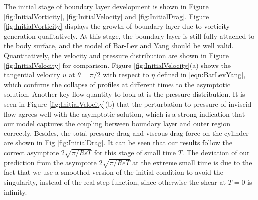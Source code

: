 The initial stage of boundary layer development is shown in Figure \ref{fig:InitialVorticity}, \ref{fig:InitialVelocity} and \ref{fig:InitialDrag}.
Figure \ref{fig:InitialVorticity} displays the growth of boundary layer due to vorticity generation qualitatively.
At this stage, the boundary layer is still fully attached to the body surface, and the model of Bar-Lev and Yang should be well valid.
Quantitatively, the velocity and pressure distribution are shown in Figure \ref{fig:InitialVelocity} for comparison.
Figure \ref{fig:InitialVelocity}(a) shows the tangential velocity $u$ at $\theta = \pi/2$ with respect to $\eta$ defined in \ref{eqn:BarLevYang}, which confirms the collapse of profiles at different times to the asymptotic solution.
Another key flow quantity to look at is the pressure distribution.
It is seen in Figure \ref{fig:InitialVelocity}(b) that the perturbation to pressure of inviscid flow agrees well with the asymptotic solution, which is a strong indication that our model captures the coupling between boundary layer and outer region correctly.
Besides, the total pressure drag and viscous drag force on the cylinder are shown in Fig \ref{fig:InitialDrag}.
It can be seen that our results follow the correct asymptote $2\sqrt{\pi/ReT}$ for this stage of small time $T$.
The deviation of our prediction from the asymptote $2\sqrt{\pi/ReT}$ at the extreme small time is due to the fact that we use a smoothed version of the initial condition to avoid the singularity, instead of the real step function, since otherwise the shear at $T = 0$ is infinity.


